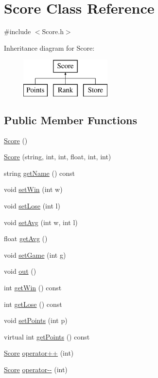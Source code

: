 \hypertarget{class_score}{}\section{Score Class Reference}
\label{class_score}


{\ttfamily \#include $<$Score.\+h$>$}

Inheritance diagram for Score\+:\begin{figure}[H]
\begin{center}
\leavevmode
\includegraphics[height=2.000000cm]{class_score}
\end{center}
\end{figure}
\subsection*{Public Member Functions}
\begin{DoxyCompactItemize}
\item 
\hyperlink{class_score_a039c99843551e5e4b512ecee99e46617}{Score} ()
\item 
\hyperlink{class_score_ae5367b41f700069f9e2ce9497e66426f}{Score} (string, int, int, float, int, int)
\item 
string \hyperlink{class_score_a0d02204131d650c52439fea0ea638720}{get\+Name} () const
\item 
void \hyperlink{class_score_a7960fbb8ef5c64918e56be6e256d5865}{set\+Win} (int w)
\item 
void \hyperlink{class_score_a70591f02bd619c64b09d1925a6a62f16}{set\+Lose} (int l)
\item 
void \hyperlink{class_score_ac075ef8fa25c2c5d63137dc44162d000}{set\+Avg} (int w, int l)
\item 
float \hyperlink{class_score_a4384da2fcbec46a731bca24a883cfed0}{get\+Avg} ()
\item 
void \hyperlink{class_score_a43f2e628a61dd5b802434e87cfd1ece5}{set\+Game} (int g)
\item 
void \hyperlink{class_score_a125441f8712f915c509ad687433f3219}{out} ()
\item 
int \hyperlink{class_score_a73db6344bb2a93f4ab29b9b2a5c13bd1}{get\+Win} () const
\item 
int \hyperlink{class_score_acfb7bf79eed840c286be8f2e05dbcc08}{get\+Lose} () const
\item 
void \hyperlink{class_score_a8d8e4762df39c231a828a26e759695e2}{set\+Points} (int p)
\item 
virtual int \hyperlink{class_score_a62f662eefb7584c4b039de697cd696e2}{get\+Points} () const
\item 
\hyperlink{class_score}{Score} \hyperlink{class_score_a9c8f64c49d6b45e12a8dd7b69cc190e0}{operator++} (int)
\item 
\hyperlink{class_score}{Score} \hyperlink{class_score_a03396e0deb4f20bcef0e815cf3a38971}{operator-\/-\/} (int)
\end{DoxyCompactItemize}
